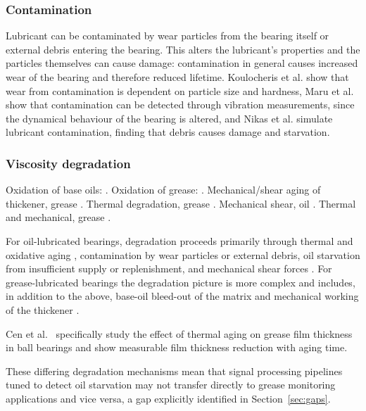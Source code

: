 \subsubsection{Contamination}
Lubricant can be contaminated by wear particles from the bearing itself or external debris entering the bearing. This alters the lubricant's properties and the particles themselves can cause damage: contamination in general causes increased wear of the bearing and therefore reduced lifetime. Koulocheris et al. \cite{koulocheris_experimental_2014} show that wear from contamination is dependent on particle size and hardness, Maru et al. \cite{maru_study_2007} show that contamination can be detected through vibration measurements, since the dynamical behaviour of the bearing is altered, and Nikas et al. \cite{nikas_effects_1998} simulate lubricant contamination, finding that debris causes damage and starvation.

\subsubsection{Viscosity degradation}

Oxidation of base oils: \cite{elnaggar_oxidation_2017}.
Oxidation of grease: \cite{schneidhofer_model_2025}.
Mechanical/shear aging of thickener, grease \cite{meijer_grease_2021}.
Thermal degradation, grease \cite{hurley_thermal_1998}.
Mechanical shear, oil \cite{wright_degradation_1983}.
Thermal and mechanical, grease \cite{chatra_thermo-mechanical_2023}.

For oil-lubricated bearings, degradation proceeds primarily through thermal and oxidative aging \cite{elnaggar_oxidation_2017}, contamination by wear particles or external debris, oil starvation from insufficient supply or replenishment, and mechanical shear forces \cite{wright_degradation_1983, elnaggar_oxidation_2017}. For grease-lubricated bearings the degradation picture is more complex and includes, in addition to the above, base-oil bleed-out of the matrix and mechanical working of the thickener \cite{lugt_grease_2012, chatra_thermo-mechanical_2023, schneidhofer_model_2025, meijer_grease_2021, hurley_thermal_1998}.

Cen et al.\ \cite{cen_effect_2025} specifically study the effect of thermal aging on grease film thickness in ball bearings and show measurable film thickness reduction with aging time.

These differing degradation mechanisms mean that signal processing pipelines tuned to detect oil starvation may not transfer directly to grease monitoring applications and vice versa, a gap explicitly identified in Section~\ref{sec:gaps}.

